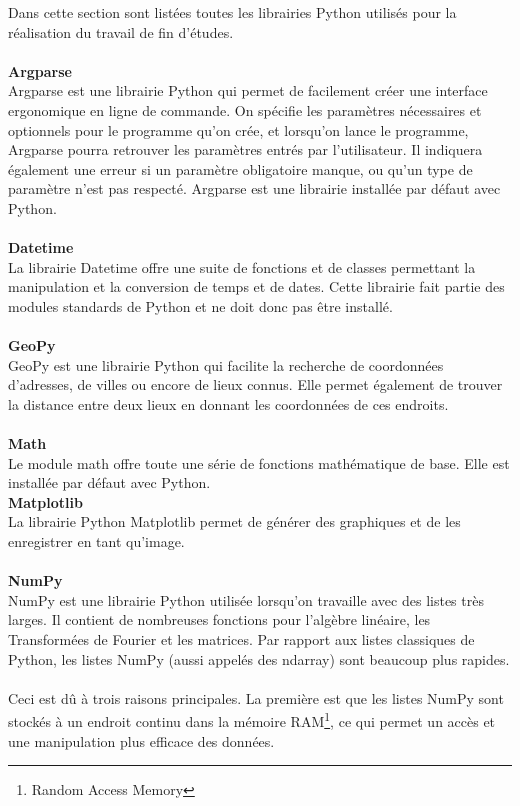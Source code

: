 \documentclass[11pt]{article}
\begin{document}
Dans cette section sont listées toutes les librairies Python utilisés pour la réalisation du travail de fin d'études.\\
\\
\textbf{Argparse}\\
Argparse est une librairie Python qui permet de facilement créer une interface ergonomique en ligne de commande.
On spécifie les paramètres nécessaires et optionnels pour le programme qu'on crée, et lorsqu'on lance le programme, Argparse pourra retrouver les paramètres entrés par l'utilisateur.
Il indiquera également une erreur si un paramètre obligatoire manque, ou qu'un type de paramètre n'est pas respecté.
Argparse est une librairie installée par défaut avec Python.\\
\\
\textbf{Datetime}\\
La librairie Datetime offre une suite de fonctions et de classes permettant la manipulation et la conversion de temps et de dates.
Cette librairie fait partie des modules standards de Python et ne doit donc pas être installé.\\
\\
\textbf{GeoPy}\\
GeoPy est une librairie Python qui facilite la recherche de coordonnées d'adresses, de villes ou encore de lieux connus.
Elle permet également de trouver la distance entre deux lieux en donnant les coordonnées de ces endroits.\\
\\
\textbf{Math}\\
Le module math offre toute une série de fonctions mathématique de base.
Elle est installée par défaut avec Python.
\\
\textbf{Matplotlib}\\
La librairie Python Matplotlib permet de générer des graphiques et de les enregistrer en tant qu'image.\\
\\
\textbf{NumPy}\\
NumPy est une librairie Python utilisée lorsqu'on travaille avec des listes très larges.
Il contient de nombreuses fonctions pour l'algèbre linéaire, les Transformées de Fourier et les matrices.
Par rapport aux listes classiques de Python, les listes NumPy (aussi appelés des ndarray) sont beaucoup plus rapides.\\
\\
Ceci est dû à trois raisons principales.
La première est que les listes NumPy sont stockés à un endroit continu dans la mémoire RAM\footnote{Random Access Memory}, ce qui permet un accès et une manipulation plus efficace des données.
\end{document}
